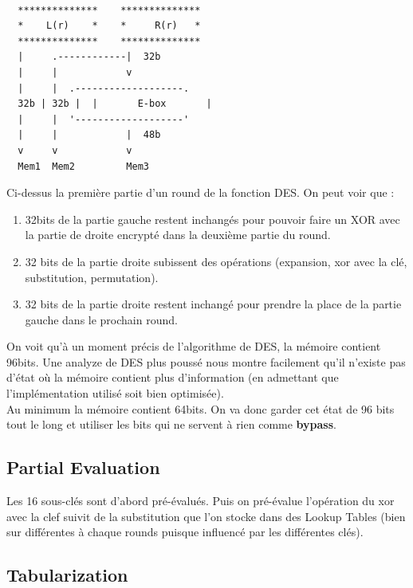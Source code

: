 \documentclass[a4paper,12pt]{article}
\begin{document}
\begin{Verbatim}

  **************    **************
  *    L(r)    *    *     R(r)   *
  **************    **************
  |     .------------|  32b
  |     |            v
  |     |  .-------------------.
  32b | 32b |  |       E-box       |
  |     |  '-------------------'
  |     |            |  48b
  v     v            v
  Mem1  Mem2         Mem3
\end{Verbatim}

Ci-dessus la première partie d'un round de la fonction DES. On peut voir que :

\begin{enumerate}
\item 32bits de la partie gauche restent inchangés pour pouvoir faire un XOR avec la partie de droite encrypté dans la deuxième partie du round.
\item 32 bits de la partie droite subissent des opérations (expansion, xor avec la clé, substitution, permutation).
\item 32 bits de la partie droite restent inchangé pour prendre la place de la partie gauche dans le prochain round.
\end{enumerate}

On voit qu'à un moment précis de l'algorithme de DES, la mémoire contient 96bits. Une analyze de DES plus poussé nous montre facilement qu'il n'existe pas d'état où la mémoire contient plus d'information (en admettant que l'implémentation utilisé soit bien optimisée).\\
Au minimum la mémoire contient 64bits. On va donc garder cet état de 96 bits tout le long et utiliser les bits qui ne servent à rien comme \textbf{bypass}.\\


\subsection{Partial Evaluation}

Les 16 sous-clés sont d'abord pré-évalués. Puis on pré-évalue l'opération du xor avec la clef suivit de la substitution que l'on stocke dans des Lookup Tables (bien sur différentes à chaque rounds puisque influencé par les différentes clés).


\subsection{Tabularization}
\end{document}
